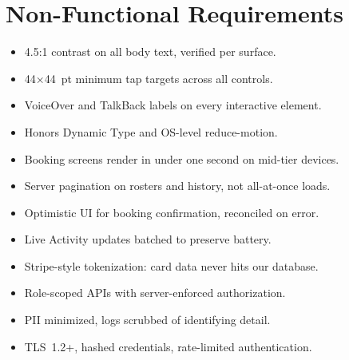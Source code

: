 \documentclass[12pt,a4paper]{article}
\begin{document}
\section{Non-Functional Requirements}
\label{sec:nfr}

\begin{description}[leftmargin=2.2em,style=nextline]
  \item[Accessibility (WCAG~2.1~AA)]\par
    \begin{itemize}[noitemsep]
      \item 4.5:1 contrast on all body text, verified per surface.
      \item 44$\times$44~pt minimum tap targets across all controls.
      \item VoiceOver and TalkBack labels on every interactive element.
      \item Honors Dynamic Type and OS-level reduce-motion.
    \end{itemize}
  \item[Performance]\par
    \begin{itemize}[noitemsep]
      \item Booking screens render in under one second on mid-tier
            devices.
      \item Server pagination on rosters and history, not all-at-once
            loads.
      \item Optimistic UI for booking confirmation, reconciled on
            error.
      \item Live Activity updates batched to preserve battery.
    \end{itemize}
  \item[Security and Privacy]\par
    \begin{itemize}[noitemsep]
      \item Stripe-style tokenization: card data never hits our
            database.
      \item Role-scoped APIs with server-enforced authorization.
      \item PII minimized, logs scrubbed of identifying detail.
      \item TLS~1.2+, hashed credentials, rate-limited authentication.
    \end{itemize}
\end{description}

\end{document}

